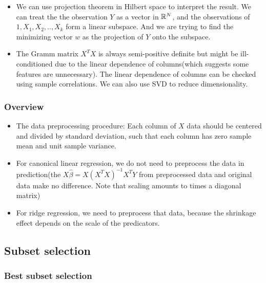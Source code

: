 \begin{refsection}
\begin{remark}[interpretation]\hfill
\begin{itemize}
    \item We can use projection theorem in Hilbert space to interpret the result. We can treat the the observation $Y$ as a vector in $\mathbb{R}^N$, and the observations of $1,X_1,X_2,..,X_k$ form a linear subspace. And we are trying to find the minimizing vector $w$ as the projection of $Y$ onto the subspace. 
    \item The Gramm matrix $X^TX$ is always semi-positive definite but might be ill-conditioned due to the linear dependence of columns(which suggests some features are unnecessary). The linear dependence of columns can be checked using sample correlations. We can also use SVD to reduce dimensionality.
\end{itemize}
\end{remark}


\subsubsection{Overview}

\begin{remark}\hfill
	\begin{itemize}
		\item The data preprocessing procedure:  Each column of $X$ data should be centered and divided by standard deviation, such that each column has zero sample mean and unit sample variance.
		\item For canonical linear regression, we do not need to preprocess the data in prediction(the $X\hat{\beta} = X(X^TX)^{-1} X^TY$ from preprocessed data and original data make no difference. Note that scaling amounts to times a diagonal matrix)
		\item For ridge regression, we need to preprocess that data, because the shrinkage effect depends on the scale of the predicators.  
		\end{itemize}
\end{remark}


\subsection{Subset selection}

\subsubsection{Best subset selection}





\end{refsection}
